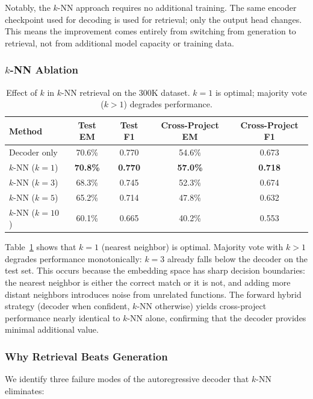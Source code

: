 \documentclass[sigconf,nonacm]{acmart}
\begin{document}
Notably, the $k$-NN approach requires no additional training. The same encoder checkpoint used for decoding is used for retrieval; only the output head changes. This means the improvement comes entirely from switching from generation to retrieval, not from additional model capacity or training data.

\subsubsection{$k$-NN Ablation}

\begin{table}[t]
    \centering
    \caption{Effect of $k$ in $k$-NN retrieval on the 300K dataset. $k{=}1$ is optimal; majority vote ($k{>}1$) degrades performance.}
    \label{tab:knn_ablation}
    \footnotesize
    \begin{tabular}{lcccc}
        \toprule
        \textbf{Method} & \textbf{Test EM} & \textbf{Test F1} & \textbf{Cross-Project EM} & \textbf{Cross-Project F1} \\
        \midrule
        Decoder only & 70.6\% & 0.770 & 54.6\% & 0.673 \\
        $k$-NN ($k{=}1$) & \textbf{70.8\%} & \textbf{0.770} & \textbf{57.0\%} & \textbf{0.718} \\
        $k$-NN ($k{=}3$) & 68.3\% & 0.745 & 52.3\% & 0.674 \\
        $k$-NN ($k{=}5$) & 65.2\% & 0.714 & 47.8\% & 0.632 \\
        $k$-NN ($k{=}10$) & 60.1\% & 0.665 & 40.2\% & 0.553 \\
        \bottomrule
    \end{tabular}
\end{table}

Table~\ref{tab:knn_ablation} shows that $k{=}1$ (nearest neighbor) is optimal. Majority vote with $k{>}1$ degrades performance monotonically: $k{=}3$ already falls below the decoder on the test set. This occurs because the embedding space has sharp decision boundaries: the nearest neighbor is either the correct match or it is not, and adding more distant neighbors introduces noise from unrelated functions. The forward hybrid strategy (decoder when confident, $k$-NN otherwise) yields cross-project performance nearly identical to $k$-NN alone, confirming that the decoder provides minimal additional value.

\subsubsection{Why Retrieval Beats Generation}
We identify three failure modes of the autoregressive decoder that $k$-NN eliminates:
\end{document}
